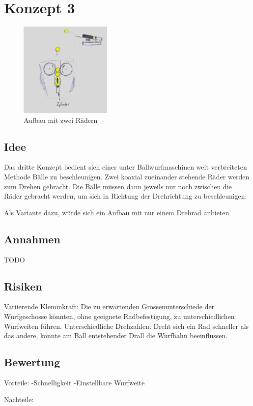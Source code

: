 \section{Konzept 3}
\begin{figure}[h!]
	\centering
	\includegraphics[width=0.4\textwidth]{../../fig/Wurfmaschine_Drehraeder.png}
	\caption{Aufbau mit zwei Rädern}
	\label{fig:drehradmaschine}
\end{figure}

\subsection{Idee}
Das dritte Konzept bedient sich einer unter Ballwurfmaschinen weit verbreiteten Methode Bälle zu beschleunigen. Zwei koaxial zueinander stehende Räder werden zum Drehen gebracht. Die Bälle müssen dann jeweils nur noch zwischen die Räder gebracht werden, um sich in Richtung der Drehrichtung zu beschleunigen.  

Als Variante dazu, würde sich ein Aufbau mit nur einem Drehrad anbieten.


\subsection{Annahmen}
TODO

\subsection{Risiken}
Variierende Klemmkraft: Die zu erwartenden Grössenunterschiede der Wurfgeschosse könnten, ohne geeignete Radbefestigung, zu unterschiedlichen Wurfweiten führen.
Unterschiedliche Drehzahlen: Dreht sich ein Rad schneller als das andere, könnte am Ball entstehender Drall die Wurfbahn beeinflussen.

\subsection{Bewertung}
Vorteile:
-Schnelligkeit
-Einstellbare Wurfweite

Nachteile:
